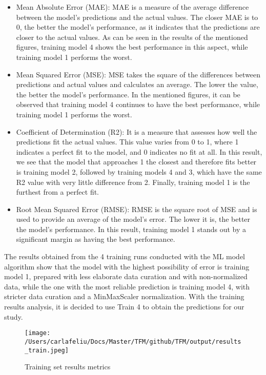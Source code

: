\documentclass[final,times,twocolumn,article]{elsarticle}
\begin{document}
\begin{itemize}
\item Mean Absolute Error (MAE): MAE is a measure of the average difference between the model's predictions and the actual values. The closer MAE is to 0, the better the model's performance, as it indicates that the predictions are closer to the actual values. As can be seen in the results of the mentioned figures, training model 4 shows the best performance in this aspect, while training model 1 performs the worst.
\item Mean Squared Error (MSE): MSE takes the square of the differences between predictions and actual values and calculates an average. The lower the value, the better the model's performance. In the mentioned figures, it can be observed that training model 4 continues to have the best performance, while training model 1 performs the worst.
\item Coefficient of Determination (R2): It is a measure that assesses how well the predictions fit the actual values. This value varies from 0 to 1, where 1 indicates a perfect fit to the model, and 0 indicates no fit at all. In this result, we see that the model that approaches 1 the closest and therefore fits better is training model 2, followed by training models 4 and 3, which have the same R2 value with very little difference from 2. Finally, training model 1 is the furthest from a perfect fit.
\item Root Mean Squared Error (RMSE): RMSE is the square root of MSE and is used to provide an average of the model's error. The lower it is, the better the model's performance. In this result, training model 1 stands out by a significant margin as having the best performance.
\end{itemize}

The results obtained from the 4 training runs conducted with the ML model algorithm show that the model with the highest possibility of error is training model 1, prepared with less elaborate data curation and with non-normalized data, while the one with the most reliable prediction is training model 4, with stricter data curation and a MinMaxScaler normalization. With the training results analysis, it is decided to use Train 4 to obtain the predictions for our study. 

\begin{figure}[ht]
    \centering 
     \texttt{[image: /Users/carlafeliu/Docs/Master/TFM/github/TFM/output/results\_train.jpeg]}	
     \caption{Training set results metrics} 
     \label{Figure1}
 \end{figure}
 
\end{document}
